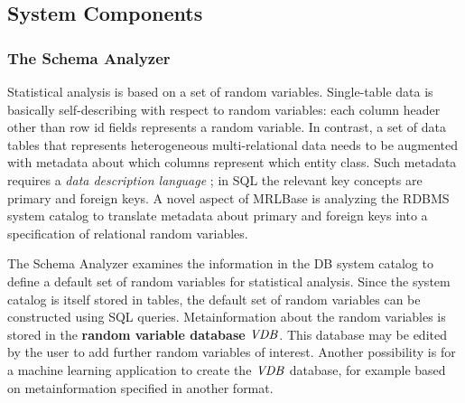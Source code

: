 \documentclass{acm_proc_article-sp}
\begin{document}
\subsection{System Components}  

\subsubsection{The Schema Analyzer}
Statistical analysis is based on a set of random variables. Single-table data is basically self-describing with respect to random variables: each column header other than row id fields represents a random variable. In contrast, a set of data tables that represents heterogeneous multi-relational data needs to be augmented with metadata about which columns represent which entity class. Such metadata requires a {\em data description language} \cite{Ullman1982}; in SQL the relevant key concepts are primary and foreign keys. 
A novel aspect of MRLBase is analyzing the RDBMS system catalog to translate metadata about primary and foreign keys into a specification of relational random variables. 

The Schema Analyzer examines the information in the DB system catalog to define a default set of random variables for statistical analysis.  Since the system catalog is itself stored in tables, the default set of random variables can be constructed using SQL queries. Metainformation about the random variables is stored in the \textbf{random variable database} $\it{VDB}$. This database may be edited by the user to add further random variables of interest. Another possibility is for a machine learning application to create the $\it{VDB}$ database, for example based on metainformation specified in another format.
\end{document}
